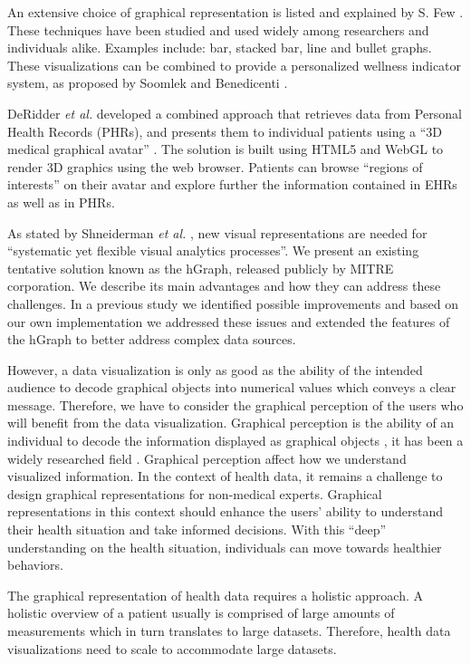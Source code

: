 \documentclass[twocolumn]{bmcart}%
\begin{document}
An extensive choice of graphical representation is listed and explained by S. Few \cite{few2006information}. These techniques have been studied and used widely among researchers and individuals alike. Examples include: bar, stacked bar, line and bullet graphs. These visualizations can be combined to provide a personalized wellness indicator system, as proposed by Soomlek and Benedicenti \cite{Soomlek:2013:AWI:2532685.2532686}.

DeRidder \textit{et al.} developed a combined approach that retrieves data from Personal Health Records (PHRs), and presents them to individual patients using a ``3D medical graphical avatar'' \cite{de2013web}. The solution is built using HTML5 and WebGL to render 3D graphics using the web browser. Patients can browse ``regions of interests'' on their avatar and explore further the information contained in EHRs as well as in PHRs.

As stated by Shneiderman \textit{et al.} \cite{shneiderman2013improving}, new visual representations are needed for ``systematic yet flexible visual analytics processes''. We present an existing tentative solution known as the hGraph, released publicly by MITRE corporation. We describe its main advantages and how they can address these challenges. In a previous study we identified possible improvements and based on our own implementation we addressed these issues and extended the features of the hGraph to better address complex data sources.

However, a data visualization is only as good as the ability of the intended audience to decode graphical objects into numerical values which conveys a clear message. Therefore, we have to consider the graphical perception of the users who will benefit from the data visualization. Graphical perception is the ability of an individual to decode the information displayed as graphical objects \cite{baird1978fundamentals}, it has been a widely researched field \cite{cleveland1984graphical}. Graphical perception affect how we understand visualized information. In the context of health data, it remains a challenge to design graphical representations for non-medical experts. Graphical representations in this context should enhance the users' ability to understand their health situation and take informed decisions. With this ``deep'' understanding on the health situation, individuals can move towards healthier behaviors.

The graphical representation of health data requires a holistic approach. A holistic overview of a patient usually is comprised of large amounts of measurements which in turn translates to large datasets. Therefore, health data visualizations need to scale to accommodate large datasets. 
\end{document}
